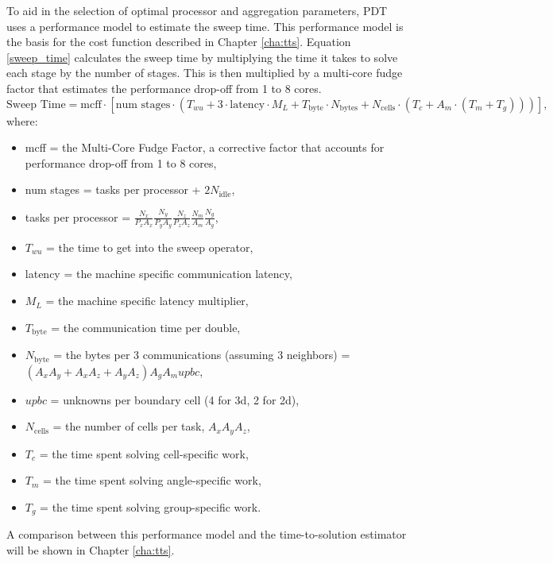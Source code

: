 To aid in the selection of optimal processor and aggregation parameters, PDT uses a performance model to estimate the sweep time.
This performance model is the basis for the cost function described in Chapter \ref{cha:tts}. 
Equation \ref{sweep_time} calculates the sweep time by multiplying the time it takes to solve each stage by the number of stages. This is then multiplied by a multi-core fudge factor that estimates the performance drop-off from 1 to 8 cores.
\begin{equation}
\text{Sweep Time} = \text{mcff}\cdot[\text{num stages}\cdot(T_{wu} + 3\cdot \text{latency}\cdot M_L + T_{\text{byte}}\cdot N_{\text{bytes}} + N_{\text{cells}}\cdot ( T_c +  A_m\cdot (T_m + T_g)))],
\label{sweep_time}
\end{equation}
where:
\begin{itemize}
  \item mcff = the Multi-Core Fudge Factor, a corrective factor that accounts for performance drop-off from 1 to 8 cores,
  \item num stages = tasks per processor + $2N_{\text{idle}}$,
  \item tasks per processor = $\frac{N_x}{P_x A_x} \frac{N_y}{P_y A_y} \frac{N_z}{P_z A_z} \frac{N_m}{A_m} \frac{N_g}{A_g}$,
  \item $T_{wu}$ = the time to get into the sweep operator,
  \item latency = the machine specific communication latency,
  \item $M_L$ = the machine specific latency multiplier,
  \item $T_{\text{byte}}$ = the communication time per double,
  \item $N_{\text{byte}}$ = the bytes per 3 communications (assuming 3 neighbors) = $(A_x A_y + A_x A_z + A_y A_z)A_g A_m upbc $,
  \item $upbc$ = unknowns per boundary cell (4 for 3d, 2 for 2d),
  \item $N_{\text{cells}}$ = the number of cells per task, $A_x A_y A_z$,
  \item $T_c$ = the time spent solving cell-specific work,
  \item $T_m$ = the time spent solving angle-specific work,
  \item $T_g$ = the time spent solving group-specific work.
\end{itemize}

A comparison between this performance model and the time-to-solution estimator will be shown in Chapter \ref{cha:tts}.

